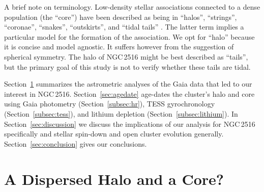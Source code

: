 \documentclass[12pt,twocolumn,tighten]{aastex63}
\begin{document}
A brief note on terminology.  Low-density stellar associations
connected to a dense population (the ``core'') have been described as
being in ``halos'', ``strings'', ``coronae'', ``snakes'',
``outskirts'', and ``tidal tails'' \citep[{\it
e.g.},][]{davenport_death_2010,kounkel_untangling_2019,roser_hyades_2019,tian_discovery_2020,meingast_2021}.
The latter term implies a particular model for the formation of the
association.  We opt for ``halo'' because it is concise and model
agnostic.  It suffers however from the suggestion of spherical
symmetry.  The halo of NGC\,2516 might be best described as ``tails'',
but the primary goal of this study is not to verify whether these
tails are tidal.

Section~\ref{sec:gaia} summarizes the astrometric analyses of the Gaia
data that led to our interest in NGC\,2516.  Section~\ref{sec:agedate}
age-dates the cluster's halo and core using Gaia photometry
(Section~\ref{subsec:hr}), TESS gyrochronology
(Section~\ref{subsec:tess}), and lithium depletion
(Section~\ref{subsec:lithium}).  In Section~\ref{sec:discussion} we
discuss the implications of our analysis for NGC\,2516 specifically
and stellar spin-down and open cluster evolution generally.
Section~\ref{sec:conclusion} gives our conclusions.


\section{A Dispersed Halo and a Core?}
\label{sec:gaia}

\end{document}
